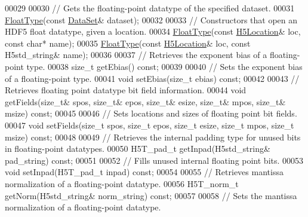 \begin{DoxyCode}
00029 
00030         \textcolor{comment}{// Gets the floating-point datatype of the specified dataset.}
00031         \hyperlink{class_h5_1_1_float_type}{FloatType}(\textcolor{keyword}{const} \hyperlink{class_h5_1_1_data_set}{DataSet}& dataset);
00032 
00033         \textcolor{comment}{// Constructors that open an HDF5 float datatype, given a location.}
00034         \hyperlink{class_h5_1_1_float_type}{FloatType}(\textcolor{keyword}{const} \hyperlink{class_h5_1_1_h5_location}{H5Location}& loc, \textcolor{keyword}{const} \textcolor{keywordtype}{char}* name);
00035         \hyperlink{class_h5_1_1_float_type}{FloatType}(\textcolor{keyword}{const} \hyperlink{class_h5_1_1_h5_location}{H5Location}& loc, \textcolor{keyword}{const} H5std\_string& name);
00036 
00037         \textcolor{comment}{// Retrieves the exponent bias of a floating-point type.}
00038         \textcolor{keywordtype}{size\_t} getEbias() \textcolor{keyword}{const};
00039 
00040         \textcolor{comment}{// Sets the exponent bias of a floating-point type.}
00041         \textcolor{keywordtype}{void} setEbias(\textcolor{keywordtype}{size\_t} ebias) \textcolor{keyword}{const};
00042 
00043         \textcolor{comment}{// Retrieves floating point datatype bit field information.}
00044         \textcolor{keywordtype}{void} getFields(\textcolor{keywordtype}{size\_t}& spos, \textcolor{keywordtype}{size\_t}& epos, \textcolor{keywordtype}{size\_t}& esize, \textcolor{keywordtype}{size\_t}& mpos, \textcolor{keywordtype}{size\_t}& msize) \textcolor{keyword}{const};
00045 
00046         \textcolor{comment}{// Sets locations and sizes of floating point bit fields.}
00047         \textcolor{keywordtype}{void} setFields(\textcolor{keywordtype}{size\_t} spos, \textcolor{keywordtype}{size\_t} epos, \textcolor{keywordtype}{size\_t} esize, \textcolor{keywordtype}{size\_t} mpos, \textcolor{keywordtype}{size\_t} msize) \textcolor{keyword}{const};
00048 
00049         \textcolor{comment}{// Retrieves the internal padding type for unused bits in floating-point datatypes.}
00050         H5T\_pad\_t getInpad(H5std\_string& pad\_string) \textcolor{keyword}{const};
00051 
00052         \textcolor{comment}{// Fills unused internal floating point bits.}
00053         \textcolor{keywordtype}{void} setInpad(H5T\_pad\_t inpad) \textcolor{keyword}{const};
00054 
00055         \textcolor{comment}{// Retrieves mantissa normalization of a floating-point datatype.}
00056         H5T\_norm\_t getNorm(H5std\_string& norm\_string) \textcolor{keyword}{const};
00057 
00058         \textcolor{comment}{// Sets the mantissa normalization of a floating-point datatype.}

\end{DoxyCode}
